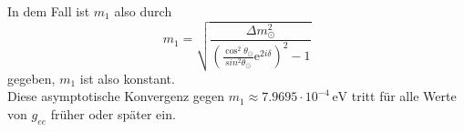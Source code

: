In dem Fall ist $m_1$ also durch
\begin{equation*}
    m_1 = \sqrt{\frac{\Delta m^2_\odot}{ \left(\frac{\cos^2 \theta_\odot}{sin^2 \theta_\odot} \mathrm{e}^{2 i \delta}\right)^2 - 1}}
\end{equation*}
gegeben, $m_1$ ist also konstant. \\
Diese asymptotische Konvergenz gegen $m_1 \approx \num{7.9695} \cdot 10^{-4} \, \si{\eV}$ tritt für alle Werte von $g_{ee}$ früher oder später ein.

